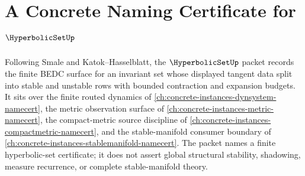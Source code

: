 \chapter{A Concrete Naming Certificate for $\HyperbolicSetUp$}
\label{ch:concrete-instances-hyperbolic-set-namecert}

Following Smale and Katok--Hasselblatt, the $\HyperbolicSetUp$ packet records
the finite BEDC surface for an invariant set whose displayed tangent data split
into stable and unstable rows with bounded contraction and expansion budgets.
It sits over the finite routed dynamics of
\autoref{ch:concrete-instances-dynsystem-namecert}, the metric observation
surface of \autoref{ch:concrete-instances-metric-namecert}, the compact-metric
source discipline of \autoref{ch:concrete-instances-compactmetric-namecert},
and the stable-manifold consumer boundary of
\autoref{ch:concrete-instances-stablemanifold-namecert}. The packet names a
finite hyperbolic-set certificate; it does not assert global structural
stability, shadowing, measure recurrence, or complete stable-manifold theory.

